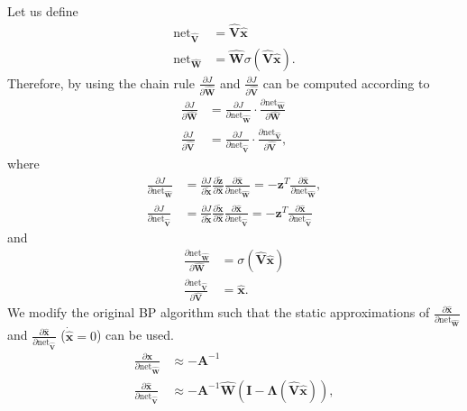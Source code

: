 \documentclass[10pt,twocolumn]{ICCAS}
\begin{document}
Let us define
\begin{align}
    \text{net}_{\hat{\mathbf{V}}} &= \hat{\mathbf{V}}\hat{\bm{x}}  \\
    \text{net}_{\hat{\mathbf{W}}} &= \hat{\mathbf{W}}\sigma(\hat{\mathbf{V}}\hat{\bm{x}}).
\end{align}
Therefore, by using the chain rule $\frac{\partial J}{\partial \hat{\mathbf{W}}}$ and $\frac{\partial J}{\partial \hat{\mathbf{V}}}$ can be computed according to
\begin{align*}
    \frac{\partial J}{\partial \hat{\mathbf{W}}} &= \frac{\partial J}{\partial \text{net}_{\hat{\mathbf{W}}}} \cdot \frac{\partial \text{net}_{\hat{\mathbf{W}}}}{\partial \hat{\mathbf{W}}} \\
    \frac{\partial J}{\partial \hat{\mathbf{V}}} &= \frac{\partial J}{\partial \text{net}_{\hat{\mathbf{V}}}} \cdot \frac{\partial \text{net}_{\hat{\mathbf{V}}}}{\partial \hat{\mathbf{V}}},
\end{align*}
where
\begin{align}
    \frac{\partial J}{\partial \text{net}_{\hat{\mathbf{W}}}} 
    &= \frac{\partial J}{\partial \tilde{\bm{x}}} \frac{\partial \tilde{\bm{z}}}{\partial \hat{\bm{x}}} \frac{\partial \hat{\bm{x}}}{\partial \text{net}_{\hat{\mathbf{W}}}} = -{\bm{z}}^T \frac{\partial \hat{\bm{x}}}{\partial \text{net}_{\hat{\mathbf{W}}}}, \nonumber \\
    \frac{\partial J}{\partial \text{net}_{\hat{\mathbf{V}}}} 
    &= \frac{\partial J}{\partial \tilde{\bm{x}}} \frac{\partial \tilde{\bm{x}}}{\partial \hat{\bm{x}}} \frac{\partial \hat{\bm{x}}}{\partial \text{net}_{\hat{\mathbf{V}}}} = -{\bm{z}}^T \frac{\partial \hat{\bm{x}}}{\partial \text{net}_{\hat{\mathbf{V}}}}
\end{align}
and
\begin{align}
    \frac{\partial \text{net}_{\hat{\mathbf{W}}}}{\partial \hat{\mathbf{W}}} &= \sigma(\hat{\mathbf{V}}\hat{\bm{x}}) \nonumber \\
    \frac{\partial \text{net}_{\hat{\mathbf{V}}}}{\partial \hat{\mathbf{V}}} &= \hat{\bm{x}}.
\end{align}
We modify the original BP algorithm such that the static approximations of $\frac{\partial \hat{\bm{x}}}{\partial \text{net}_{\hat{\mathbf{W}}}}$ and $\frac{\partial \hat{\bm{x}}}{\partial \text{net}_{\hat{\mathbf{V}}}}$ ($\dot{\hat{\bm{x}}} = 0$) can be used.
\begin{align}
    \frac{\partial \hat{\bm{x}}}{\partial \text{net}_{\hat{\mathbf{W}}}} &\approx -\mathbf{A}^{-1} \nonumber \\
    \frac{\partial \hat{\bm{x}}}{\partial \text{net}_{\hat{\mathbf{V}}}} &\approx -\mathbf{A}^{-1}\hat{\mathbf{W}}(\mathbf{I} - \mathbf{\Lambda}(\hat{\mathbf{V}}\hat{\bm{x}})), 
\end{align}
\end{document}
